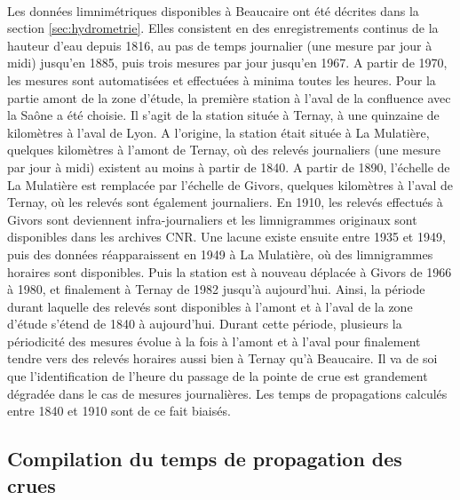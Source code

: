 \documentclass[11pt]{article}
\begin{document}
	\paragraph{} Les données limnimétriques disponibles à Beaucaire ont été décrites dans la section \ref{sec:hydrometrie}. Elles consistent en des enregistrements continus de la hauteur d'eau depuis 1816, au pas de temps journalier (une mesure par jour à midi) jusqu'en 1885, puis trois mesures par jour jusqu'en 1967. A partir de 1970, les mesures sont automatisées et effectuées à minima toutes les heures. Pour la partie amont de la zone d'étude, la première station à l'aval de la confluence avec la Saône a été choisie. Il s'agit de la station située à Ternay, à une quinzaine de kilomètres à l'aval de Lyon. A l'origine, la station était située à La Mulatière, quelques kilomètres à l'amont de Ternay, où des relevés journaliers (une mesure par jour à midi) existent au moins à partir de 1840. A partir de 1890, l'échelle de La Mulatière est remplacée par l'échelle de Givors, quelques kilomètres à l'aval de Ternay, où les relevés sont également journaliers. En 1910, les relevés effectués à Givors sont deviennent infra-journaliers et les limnigrammes originaux sont disponibles dans les archives CNR. Une lacune existe ensuite entre 1935 et 1949, puis des données réapparaissent en 1949 à La Mulatière, où des limnigrammes horaires sont disponibles. Puis la station est à nouveau déplacée à Givors de 1966 à 1980, et finalement à Ternay de 1982 jusqu'à aujourd'hui. Ainsi, la période durant laquelle des relevés sont disponibles à l'amont et à l'aval de la zone d'étude s'étend de 1840 à aujourd'hui. Durant cette période, plusieurs la périodicité des mesures évolue à la fois à l'amont et à l'aval pour finalement tendre vers des relevés horaires aussi bien à Ternay qu'à Beaucaire. Il va de soi que l'identification de l'heure du passage de la pointe de crue est grandement dégradée dans le cas de mesures journalières. Les temps de propagations calculés entre 1840 et 1910 sont de ce fait biaisés.
	
	
	
		
	\subsection{Compilation du temps de propagation des crues}

	
\end{document}
